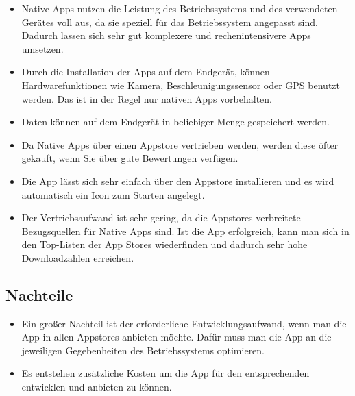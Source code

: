 \begin{itemize}

	\item Native Apps nutzen die Leistung des Betriebssystems und des verwendeten Gerätes voll aus, da sie speziell für das Betriebssystem angepasst sind. Dadurch lassen sich sehr gut komplexere und rechenintensivere Apps umsetzen.\cite[]{WEB:APPEV:2014}

	\item Durch die Installation der Apps auf dem Endgerät, können Hardwarefunktionen wie Kamera, Beschleunigungssensor oder \ac{GPS} benutzt werden. Das ist in der Regel nur nativen Apps vorbehalten.\cite[]{WEB:APPEV:2014}

	\item Daten können auf dem Endgerät in beliebiger Menge gespeichert werden.\cite[]{WEB:APPEV:2014}

	\item Da Native Apps über einen Appstore vertrieben werden, werden diese öfter gekauft, wenn Sie über gute Bewertungen verfügen.\cite[]{WEB:APPEV:2014}

	\item Die App lässt sich sehr einfach über den Appstore installieren und es wird automatisch ein Icon zum Starten angelegt.\cite[]{WEB:APPEV:2014}

	\item Der Vertriebsaufwand ist sehr gering, da die Appstores verbreitete Bezugsquellen für Native Apps sind. Ist die App erfolgreich, kann man sich in den Top-Listen der App Stores wiederfinden und dadurch sehr hohe Downloadzahlen erreichen.\cite[]{WEB:APPEV:2014}

\end{itemize}

\subsection{Nachteile}
\label{sec:native:cons}

\begin{itemize}

	\item Ein großer Nachteil ist der erforderliche Entwicklungsaufwand, wenn man die App in allen Appstores anbieten möchte. Dafür muss man die App an die jeweiligen Gegebenheiten des Betriebssystems optimieren.\cite[]{WEB:APPEV:2014}

	\item Es entstehen zusätzliche Kosten um die App für den entsprechenden entwicklen und anbieten zu können.

\end{itemize}

